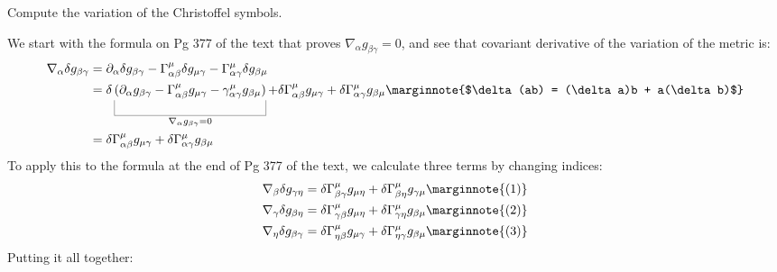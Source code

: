 \documentclass[10pt]{article}
\begin{document}
\begin{example}\label{b3e24}
	Compute the variation of the Christoffel symbols.
\end{example}
\sol We start with the formula on Pg 377 of the text that proves $\nabla_\alpha g_{\beta\gamma}=0$, and see that covariant derivative of the variation of the metric is:
$$
\begin{aligned}
	\nabla_\alpha \delta g_{\beta\gamma} &= \partial_\alpha \delta g_{\beta\gamma} - \Gamma_{\alpha\beta}^\mu \delta g_{\mu\gamma} - \Gamma_{\alpha\gamma}^\mu \delta g_{\beta\mu}\\
	&= \delta\ub{\p{\partial_\alpha g_{\beta\gamma} - \Gamma_{\alpha\beta}^\mu g_{\mu\gamma} - \gamma_{\alpha\gamma}^\mu g_{\beta\mu}}}{\nabla_\alpha g_{\beta\gamma}=0} + \delta \Gamma_{\alpha\beta}^\mu g_{\mu\gamma} + \delta \Gamma_{\alpha\gamma}^\mu g_{\beta\mu}\marginnote{$\delta(ab) = (\delta a)b + a(\delta b)$}\\
	&= \delta \Gamma_{\alpha\beta}^\mu g_{\mu\gamma} + \delta \Gamma_{\alpha\gamma}^\mu g_{\beta\mu}
\end{aligned}
$$
To apply this to the formula at the end of Pg 377 of the text, we calculate three terms by changing indices:
$$
\begin{aligned}
	\nabla_\beta \delta g_{\gamma\eta} &= \delta \Gamma_{\beta\gamma}^\mu g_{\mu\eta} + \delta \Gamma_{\beta\eta}^\mu g_{\gamma\mu}\marginnote{(1)}\\
	\nabla_\gamma \delta g_{\beta\eta} &= \delta \Gamma_{\gamma\beta}^\mu g_{\mu\eta} + \delta \Gamma_{\gamma\eta}^\mu g_{\beta\mu}\marginnote{(2)}\\
	\nabla_\eta \delta g_{\beta\gamma} &= \delta \Gamma_{\eta\beta}^\mu g_{\mu\gamma} + \delta \Gamma_{\eta\gamma}^\mu g_{\beta\mu}\marginnote{(3)}\\
\end{aligned}
$$
Putting it all together:
\end{document}
